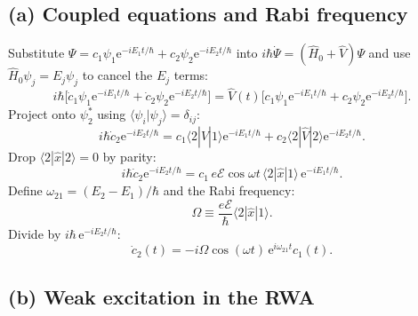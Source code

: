\documentclass[11pt]{article}
\begin{document}
\subsection*{(a) Coupled equations and Rabi frequency}

Substitute $\Psi=c_{1}\psi_{1}\mathrm{e}^{-iE_{1}t/\hbar}+c_{2}\psi_{2}\mathrm{e}^{-iE_{2}t/\hbar}$ into $i\hbar\dot\Psi=(\hat H_{0}+\hat V)\Psi$ and use $\hat H_{0}\psi_{j}=E_{j}\psi_{j}$ to cancel the $E_{j}$ terms:
\begin{equation}
i\hbar\bigl[\dot c_{1}\psi_{1}\mathrm{e}^{-iE_{1}t/\hbar}+\dot c_{2}\psi_{2}\mathrm{e}^{-iE_{2}t/\hbar}\bigr]=\hat V(t)\bigl[c_{1}\psi_{1}\mathrm{e}^{-iE_{1}t/\hbar}+c_{2}\psi_{2}\mathrm{e}^{-iE_{2}t/\hbar}\bigr].
\label{eq:TDSE-2lvl}
\end{equation}
Project onto $\psi_{2}^{*}$ using $\langle\psi_{i}|\psi_{j}\rangle=\delta_{ij}$:
\begin{equation}
i\hbar\dot c_{2}\mathrm{e}^{-iE_{2}t/\hbar}=c_{1}\langle 2|\hat V|1\rangle\mathrm{e}^{-iE_{1}t/\hbar}+c_{2}\langle 2|\hat V|2\rangle\mathrm{e}^{-iE_{2}t/\hbar}.
\label{eq:project2}
\end{equation}
Drop $\langle 2|\hat x|2\rangle=0$ by parity:
\begin{equation}
i\hbar\dot c_{2}\mathrm{e}^{-iE_{2}t/\hbar}=c_{1}\,e\mathcal{E}\cos\omega t\,\langle 2|\hat x|1\rangle\,\mathrm{e}^{-iE_{1}t/\hbar}.
\end{equation}
Define $\omega_{21}=(E_{2}-E_{1})/\hbar$ and the Rabi frequency:
\begin{equation}
\boxed{\;\Omega\equiv\frac{e\mathcal{E}}{\hbar}\langle 2|\hat x|1\rangle.\;}
\label{eq:Rabi-defn}
\end{equation}
Divide by $i\hbar\,\mathrm{e}^{-iE_{2}t/\hbar}$:
\begin{equation}
\boxed{\;\dot c_{2}(t)=-i\Omega\cos(\omega t)\,\mathrm{e}^{i\omega_{21}t}c_{1}(t).\;}
\label{eq:c2dot}
\end{equation}

\subsection*{(b) Weak excitation in the RWA}
\end{document}
